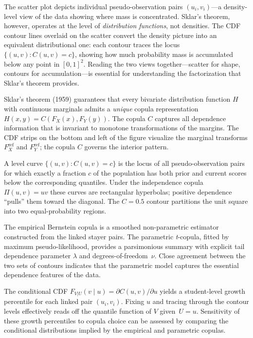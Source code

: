 \documentclass[10pt]{article}
\newlength{\fnlabelwidth}
\newcommand{\fnline}[2]{%
  \par\noindent
  \makebox[\fnlabelwidth][l]{$^{#1}$}%
  \parbox[t]{\dimexpr\linewidth-\fnlabelwidth\relax}{#2}%
  \par
}
\begin{document}
\noindent
\hspace{0.45in}%
\begin{minipage}[t]{7.5in}
\footnotesize\raggedright
\setlength{\parskip}{0pt}

\fnline{1}{The scatter plot depicts individual pseudo-observation pairs
$(u_i, v_i)$---a density-level view of the data showing where mass
is concentrated. Sklar's theorem, however, operates at the level of
\emph{distribution functions}, not densities. The CDF contour lines
overlaid on the scatter convert the density picture into an
equivalent distributional one: each contour traces the locus
$\{(u,v) : C(u,v) = c\}$, showing how much probability mass is
accumulated below any point in $[0,1]^2$. Reading the two views
together---scatter for shape, contours for accumulation---is
essential for understanding the factorization that Sklar's theorem
provides.}

\vspace{4pt}
\fnline{2}{Sklar's theorem (1959) guarantees that every bivariate
distribution function $H$ with continuous marginals admits a
\emph{unique} copula representation $H(x,y) = C(F_X(x), F_Y(y))$.
The copula $C$ captures all dependence information that is invariant
to monotone transformations of the margins.  The CDF strips on the
bottom and left of the figure visualize the marginal transforms
$F_X^{\mathrm{ref}}$ and $F_Y^{\mathrm{ref}}$; the copula $C$
governs the interior pattern.}

\vspace{4pt}
\fnline{3}{A level curve $\{(u,v) : C(u,v) = c\}$ is the locus of all
pseudo-observation pairs for which exactly a fraction $c$ of the
population has both prior and current scores below the
corresponding quantiles.  Under the independence copula
$\Pi(u,v) = uv$ these curves are rectangular hyperbolas; positive
dependence ``pulls'' them toward the diagonal.  The $C = 0.5$
contour partitions the unit square into two equal-probability
regions.}

\vspace{4pt}
\fnline{4}{The empirical Bernstein copula is a smoothed non-parametric
estimator constructed from the linked stayer pairs.  The parametric
\textit{t}-copula, fitted by maximum pseudo-likelihood, provides a
parsimonious summary with explicit tail dependence parameter
$\lambda$ and degrees-of-freedom~$\nu$. Close agreement between
the two sets of contours indicates that the parametric model
captures the essential dependence features of the data.}

\vspace{4pt}
\fnline{5}{The conditional CDF $F_{V|U}(v \mid u) = \partial C(u,v) /
\partial u$ yields a student-level growth percentile for each
linked pair $(u_i, v_i)$.  Fixing $u$ and tracing through the
contour levels effectively reads off the quantile function of $V$
given~$U = u$. Sensitivity of these growth percentiles to copula
choice can be assessed by comparing the conditional distributions
implied by the empirical and parametric copulas.}

\end{minipage}
\end{document}
